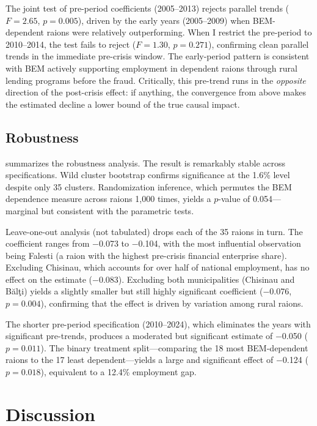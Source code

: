 \documentclass[12pt]{article}
\begin{document}
The joint test of pre-period coefficients (2005--2013) rejects parallel trends ($F = 2.65$, $p = 0.005$), driven by the early years (2005--2009) when BEM-dependent raions were relatively outperforming. When I restrict the pre-period to 2010--2014, the test fails to reject ($F = 1.30$, $p = 0.271$), confirming clean parallel trends in the immediate pre-crisis window. The early-period pattern is consistent with BEM actively supporting employment in dependent raions through rural lending programs before the fraud. Critically, this pre-trend runs in the \emph{opposite} direction of the post-crisis effect: if anything, the convergence from above makes the estimated decline a lower bound of the true causal impact.

\subsection{Robustness}



 summarizes the robustness analysis. The result is remarkably stable across specifications. Wild cluster bootstrap confirms significance at the 1.6\% level despite only 35 clusters. Randomization inference, which permutes the BEM dependence measure across raions 1,000 times, yields a $p$-value of 0.054---marginal but consistent with the parametric tests.

Leave-one-out analysis (not tabulated) drops each of the 35 raions in turn. The coefficient ranges from $-$0.073 to $-$0.104, with the most influential observation being Falesti (a raion with the highest pre-crisis financial enterprise share). Excluding Chisinau, which accounts for over half of national employment, has no effect on the estimate ($-$0.083). Excluding both municipalities (Chisinau and B\u{a}l\c{t}i) yields a slightly smaller but still highly significant coefficient ($-$0.076, $p = 0.004$), confirming that the effect is driven by variation among rural raions.

The shorter pre-period specification (2010--2024), which eliminates the years with significant pre-trends, produces a moderated but significant estimate of $-$0.050 ($p = 0.011$). The binary treatment split---comparing the 18 most BEM-dependent raions to the 17 least dependent---yields a large and significant effect of $-$0.124 ($p = 0.018$), equivalent to a 12.4\% employment gap.


\section{Discussion}
\label{sec:discussion}
\end{document}
